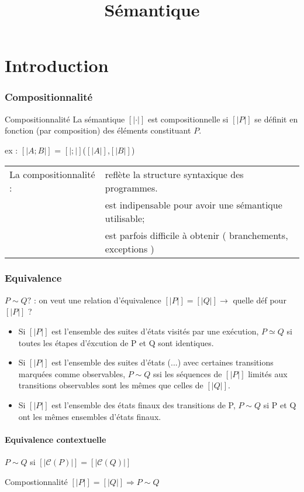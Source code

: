 \documentclass[10pt,a4paper]{article}
\title{Sémantique}
\newcommand{\sem}[1]{$\left[| #1 | \right]$}
\newcommand{\semm}[1]{\left[| #1 | \right]}
\begin{document}
\part{Introduction}
\section{Compositionnalité}

\begin{definition}{Compositionnalité}
 La sémantique \sem{\cdot} est compositionnelle si \sem{P} se définit en fonction (par composition) des éléments constituant $P$.\\
\end{definition}

ex : \sem{A;B} = \sem{;}(\sem{A},\sem{B})\\

\begin{tabular}{l l}
La compositionnalité : & reflète la structure syntaxique des programmes.\\
& est indipensable pour avoir une sémantique utilisable;\\
& est parfois difficile à obtenir ( branchements, exceptions )
\end{tabular}





\section{Equivalence}
$P \sim Q ?$ : on veut une relation d'équivalence
$\semm{P} = \semm{Q} \rightarrow$ quelle déf pour \sem{P} ?\\
\begin{itemize}
\item Si \sem{P} est l'ensemble des suites d'états visités par une exécution, $P \simeq Q$ si toutes les étapes d'éxcution de P et Q sont identiques.
\item Si \sem{P} est l'ensemble des suites d'états (...) avec certaines transitions marquées comme observables, $P \sim Q$ ssi les séquences de \sem{P} limités aux transitions observables sont les mêmes que celles de \sem{Q}.
\item Si \sem{P} est l'ensemble des états finaux des transitions de P, $P \sim Q$ si P et Q ont les mêmes ensembles d'états finaux.
\end{itemize}
\subsection{Equivalence contextuelle}
$P \sim Q$ si $\semm{\mathcal{C}(P)} = \semm{\mathcal{C}(Q)}$
\begin{propriete}{Compostionnalité}
$\semm P = \semm Q  \Rightarrow P \sim Q$
\end{propriete}
\end{document}
